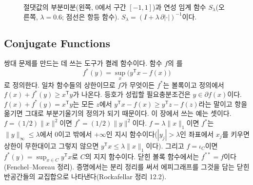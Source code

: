\begin{figure}[htbp]
\centering
{}\hfill
{}
\caption{절댓값의 부분미분(왼쪽, $0$에서 구간 $[-1,1]$)과 연성 임계 함수 $S_\lambda$(오른쪽, $\lambda=0.6$; 점선은 항등 함수). $S_\lambda=(I+\lambda\,\partial|\cdot|)^{-1}$이다.}
\label{fig:soft}
\end{figure}

\subsection{Conjugate Functions}

쌍대 문제를 만드는 데 쓰는 도구가 켤레 함수이다. 함수 $f$의 를
\[
f^\ast(y)=\sup_x\bigl(y^{\mathsf T}x-f(x)\bigr)
\]
로 정의한다. 일차 함수들의 상한이므로 $f$가 무엇이든 $f^\ast$는 볼록이고 정의에서  $f(x)+f^\ast(y)\ge x^{\mathsf T}y$가 나온다. 등호가 성립할 필요충분조건은 $y\in\partial f(x)$이다. $f(x)+f^\ast(y)=x^{\mathsf T}y$는 모든 $z$에서 $y^{\mathsf T}x-f(x)\ge y^{\mathsf T}z-f(z)$라는 말이고 항을 옮기면 그대로 부분기울기의 정의가 되기 때문이다. 이 장에서 쓰는 예는 셋이다. $f=(1/2)\|x\|^2$이면 $f^\ast=(1/2)\|y\|^2$이다. $f=\lambda\|x\|_1$이면 $f^\ast$는 $\|y\|_\infty\le\lambda$에서 $0$이고 밖에서 $+\infty$인 지시 함수이다($|y_j|>\lambda$인 좌표에서 $x_j$를 키우면 상한이 무한대이고 그렇지 않으면 $y^{\mathsf T}x\le\lambda\|x\|_1$이다). 그리고 $f=\iota_C$이면 $f^\ast(y)=\sup_{x\in C}y^{\mathsf T}x$로 $C$의 지지 함수이다. 닫힌 볼록 함수에서는 $f^{\ast\ast}=f$이다(Fenchel--Moreau 정리). 증명에서는 분리 정리를 써서 에피그래프를 그것을 담는 닫힌 반공간들의 교집합으로 나타낸다(Rockafellar\cite{rockafellar1970} 정리 12.2).

